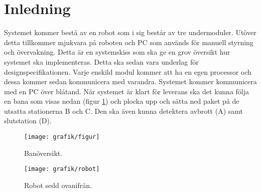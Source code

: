 \section{Inledning}
Systemet kommer bestå av en robot som i sig består av tre undermoduler. Utöver detta tillkommer mjukvara på roboten och PC som används för manuell styrning och övervakning. Detta är en systemskiss som ska ge en grov översikt hur systemet ska implementeras. Detta ska sedan vara underlag för designspecifikationen.
\newline
\newline
Varje enskild modul kommer att ha en egen processor och dessa kommer sedan kommunicera med varandra. Systemet kommer kommunicera med en PC över blåtand. När systemet är klart för leverans ska det kunna följa en bana som visas nedan (figur \ref{systemskiss:banoversikt}) och plocka upp och sätta ned paket på de utsatta stationerna B och C. Den ska även kunna detektera avbrott (A) samt slutstation (D).

\begin{figure}[h]
\center
\texttt{[image: grafik/figur]}
\caption{Banöversikt.} \label{systemskiss:banoversikt}
\end{figure}

\begin{figure}[h]
\center
\texttt{[image: grafik/robot]}
\caption{Robot sedd ovanifrån.}
\end{figure}

